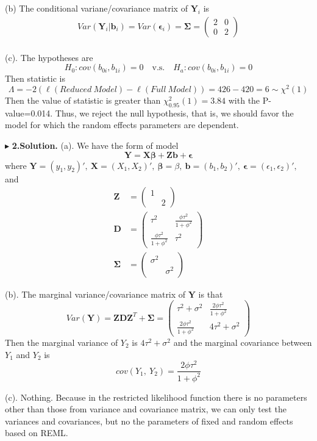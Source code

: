 \documentclass[letterpaper, 12pt]{article}
\newcommand{\ba}{$$\begin{aligned}}
\newcommand{\ea}{\end{aligned}$$}
\begin{document}
(b) The conditional variane/covariance matrix of $\bm{Y}_i$ is 
\ba
Var(\bm{Y}_i|\bm{b}_i)=Var(\bm{\epsilon}_i)=\bm{\Sigma}=\left(\begin{matrix}
2&0\\
0&2
\end{matrix}\right)\\
\ea

(c). The hypotheses are
$$
H_0:cov(b_{0i},b_{1i})=0\quad\text{v.s.}\quad H_a:cov(b_{0i},b_{1i})=0
$$
Then statistic is 
$$
\Lambda=-2(\ell(Reduced~Model)-\ell(Full~Model))=426-420=6\sim\chi^2(1)
$$
Then the value of statistic is greater than $\chi^2_{0.95}(1)=3.84$ with the P-value=0.014. Thus, we reject the null hypothesis, that is, we should favor the model for which the random effects parameters are dependent.



$\blacktriangleright$ \textbf{2.\quad Solution.} 
(a). We have the form of model 
$$
\bm{Y}=\bm{X}\bm{\beta}+\bm{Z}\bm{b}+\bm{\epsilon}
$$
where $
\bm{Y}=(y_1,y_2)',~
\bm{X}=(X_1,X_2)',~
\bm{\beta}=\beta,~
\bm{b}=(b_1,b_2)',~
\bm{\epsilon}=(\epsilon_1,\epsilon_2)',
$ and
\ba
\bm{Z}&=\left(\begin{matrix}
1\\
&2\end{matrix}\right)\\
\bm{D}&=\left(\begin{matrix}
\tau^2&\frac{\phi\tau^2}{1+\phi^2}\\
\frac{\phi\tau^2}{1+\phi^2}&\tau^2\end{matrix}\right)\\
\bm{\Sigma}&=\left(\begin{matrix}
\sigma^2\\
&\sigma^2\end{matrix}\right)
\ea


(b). The marginal variance/covariance matrix of $\bm{Y}$ is that
$$
Var(\bm{Y})=\bm{ZDZ}^T+\bm{\Sigma}=\left(\begin{matrix}
\tau^2+\sigma^2&\frac{2\phi\tau^2}{1+\phi^2}\\
\frac{2\phi\tau^2}{1+\phi^2}&4\tau^2+\sigma^2\end{matrix}\right)
$$
Then the marginal variance of $Y_2$ is $4\tau^2+\sigma^2$ and the marginal covariance between $Y_1$ and $Y_2$ is 
$$
cov(Y_1,~Y_2)=\frac{2\phi\tau^2}{1+\phi^2}
$$



(c). Nothing. Because in the restricted likelihood function there is no parameters other than those from variance and covariance matrix, we can only test the variances and covariances, but no the parameters of fixed and random effects based on REML. 
\end{document}
